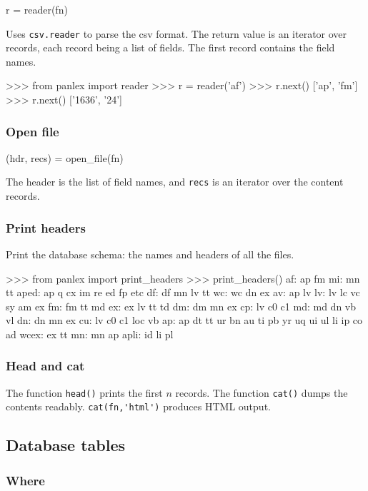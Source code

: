 \begin{myverb}
r = reader(fn)
\end{myverb}
Uses {\tt csv.reader} to parse the csv format.
The return value is an iterator over records, each record being a list
of fields.  The first record contains the field names.
\begin{myverb}
>>> from panlex import reader
>>> r = reader('af')
>>> r.next()
['ap', 'fm']
>>> r.next()
['1636', '24']
\end{myverb}

\subsubsection{Open file}

\begin{myverb}
(hdr, recs) = open_file(fn)
\end{myverb}
The header is the list of field names, and {\tt recs} is an iterator
over the content records.

\subsubsection{Print headers}

Print the database schema: the names and headers of all the files.
\begin{myverb}
>>> from panlex import print_headers
>>> print_headers()
af: ap fm
mi: mn tt
aped: ap q cx im re ed fp etc
df: df mn lv tt
wc: wc dn ex
av: ap lv
lv: lv lc vc sy am ex
fm: fm tt md
ex: ex lv tt td
dm: dm mn ex
cp: lv c0 c1
md: md dn vb vl
dn: dn mn ex
cu: lv c0 c1 loc vb
ap: ap dt tt ur bn au ti pb yr uq ui ul li ip co ad
wcex: ex tt
mn: mn ap
apli: id li pl
\end{myverb}

\subsubsection{Head and cat}

The function {\tt head()} prints the first $n$ records.  The function
{\tt cat()} dumps the contents readably.  \verb|cat(fn,'html')|
produces HTML output.

\subsection{Database tables}

\subsubsection{Where}

